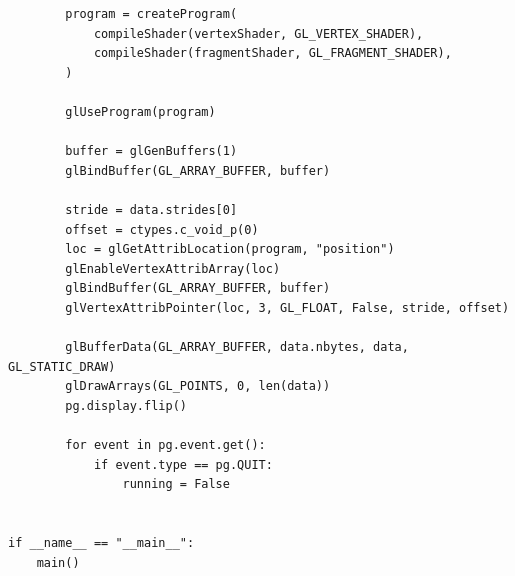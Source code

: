 \documentclass[12pt]{article}
\begin{document}
\begin{verbatim}
        program = createProgram(
            compileShader(vertexShader, GL_VERTEX_SHADER),
            compileShader(fragmentShader, GL_FRAGMENT_SHADER),
        )

        glUseProgram(program)

        buffer = glGenBuffers(1)
        glBindBuffer(GL_ARRAY_BUFFER, buffer)

        stride = data.strides[0]
        offset = ctypes.c_void_p(0)
        loc = glGetAttribLocation(program, "position")
        glEnableVertexAttribArray(loc)
        glBindBuffer(GL_ARRAY_BUFFER, buffer)
        glVertexAttribPointer(loc, 3, GL_FLOAT, False, stride, offset)

        glBufferData(GL_ARRAY_BUFFER, data.nbytes, data, GL_STATIC_DRAW)
        glDrawArrays(GL_POINTS, 0, len(data))
        pg.display.flip()

        for event in pg.event.get():
            if event.type == pg.QUIT:
                running = False


if __name__ == "__main__":
    main()

\end{verbatim}


\clearpage
\end{document}
